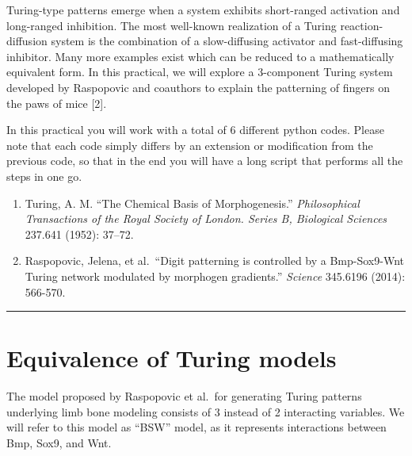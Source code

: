 \documentclass[
  letterpaper,
  DIV=11,
  numbers=noendperiod]{scrreprt}
\providecommand{\tightlist}{%
  \setlength{\itemsep}{0pt}\setlength{\parskip}{0pt}}\usepackage{longtable,booktabs,array}
\theoremstyle{definition}
\theoremstyle{remark}
\begin{document}
Turing-type patterns emerge when a system exhibits short-ranged
activation and long-ranged inhibition. The most well-known realization
of a Turing reaction-diffusion system is the combination of a
slow-diffusing activator and fast-diffusing inhibitor. Many more
examples exist which can be reduced to a mathematically equivalent form.
In this practical, we will explore a 3-component Turing system developed
by Raspopovic and coauthors to explain the patterning of fingers on the
paws of mice {[}2{]}.

In this practical you will work with a total of 6 different python
codes. Please note that each code simply differs by an extension or
modification from the previous code, so that in the end you will have a
long script that performs all the steps in one go.

\begin{enumerate}
\def\labelenumi{\arabic{enumi}.}
\tightlist
\item
  Turing, A. M. ``The Chemical Basis of Morphogenesis.''
  \emph{Philosophical Transactions of the Royal Society of London.
  Series B, Biological Sciences} 237.641 (1952): 37--72.\\
\item
  Raspopovic, Jelena, et al.~``Digit patterning is controlled by a
  Bmp-Sox9-Wnt Turing network modulated by morphogen gradients.''
  \emph{Science} 345.6196 (2014): 566-570.
\end{enumerate}

\begin{center}\rule{0.5\linewidth}{0.5pt}\end{center}

\section{Equivalence of Turing
models}\label{equivalence-of-turing-models}

The model proposed by Raspopovic et al.~for generating Turing patterns
underlying limb bone modeling consists of 3 instead of 2 interacting
variables. We will refer to this model as ``BSW'' model, as it
represents interactions between Bmp, Sox9, and Wnt.
\end{document}
